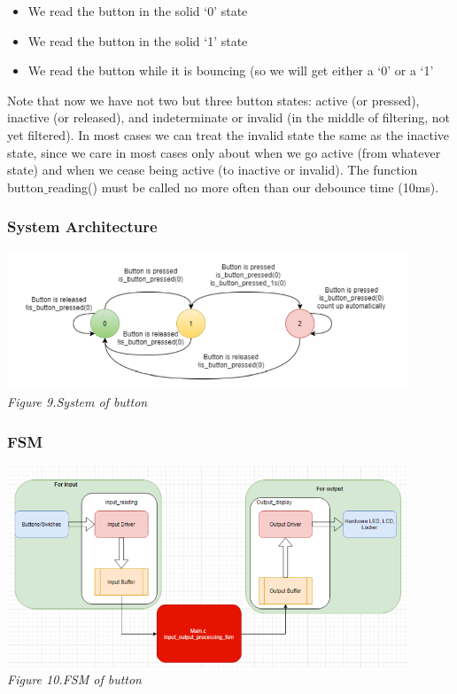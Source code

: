 \documentclass[a4paper]{article}
\begin{document}
\begin{itemize}
    \item We read the button in the solid ‘0’ state
    \item We read the button in the solid ‘1’ state
    \item We read the button while it is bouncing (so we will get either a ‘0’ or a ‘1’
\end{itemize}
Note that now we have not two but three button states: active (or pressed), inactive (or released), and indeterminate or invalid (in the middle of filtering, not yet filtered). In most cases we can treat the invalid state the same as the inactive state, since we care in most cases only about when we go active (from whatever state) and when we cease being active (to inactive or invalid). The function button$\_$reading() must be called no more often than our debounce time (10ms).
\subsubsection{System Architecture}
\medskip
\begin{center}
    \includegraphics[width=12cm]{pictures/7.png}\\
    \textit{Figure 9.System of button}\\
\end{center}
\medskip
\subsubsection{FSM}
\medskip
\begin{center}
    \includegraphics[width=12cm]{pictures/8.png}\\
    \textit{Figure 10.FSM of button}\\
\end{center}
\medskip
\end{document}
